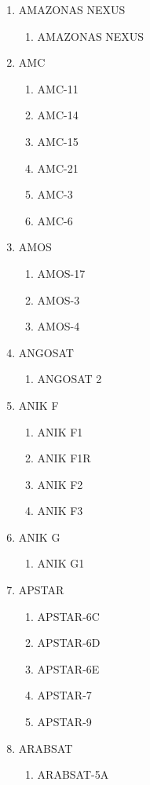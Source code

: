 \begin{multicols}{2}
\begin{enumerate}
  \item AMAZONAS NEXUS
  \begin{enumerate}
    \item AMAZONAS NEXUS
  \end{enumerate}
  \item AMC
  \begin{enumerate}
    \item AMC-11
    \item AMC-14
    \item AMC-15
    \item AMC-21
    \item AMC-3
    \item AMC-6
  \end{enumerate}
  \item AMOS
  \begin{enumerate}
    \item AMOS-17
    \item AMOS-3
    \item AMOS-4
  \end{enumerate}
  \item ANGOSAT
  \begin{enumerate}
    \item ANGOSAT 2
  \end{enumerate}
  \item ANIK F
  \begin{enumerate}
    \item ANIK F1
    \item ANIK F1R
    \item ANIK F2
    \item ANIK F3
  \end{enumerate}
  \item ANIK G
  \begin{enumerate}
    \item ANIK G1
  \end{enumerate}
  \item APSTAR
  \begin{enumerate}
    \item APSTAR-6C
    \item APSTAR-6D
    \item APSTAR-6E
    \item APSTAR-7
    \item APSTAR-9
  \end{enumerate}
  \item ARABSAT
  \begin{enumerate}
    \item ARABSAT-5A

\end{enumerate}
\end{enumerate}
\end{multicols}
